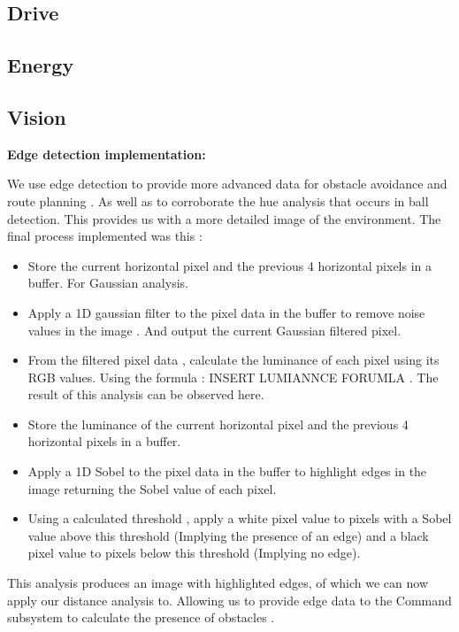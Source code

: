 \documentclass[10pt,twoside]{article}
\begin{document}
\subsection{Drive}

\subsection{Energy}

\subsection{Vision}

\textbf{Edge detection implementation:}

We use edge detection to provide more advanced data for obstacle avoidance and route planning . As well as to corroborate the hue analysis that occurs in ball detection. This provides us with a more detailed image of the environment. 
The final process implemented was this :

\begin{itemize}
    \itemsep-0.5em
    \item Store the current horizontal pixel and the previous 4 horizontal pixels in a buffer. For Gaussian analysis.
    \item Apply a 1D gaussian filter to the  pixel data in the buffer to remove noise values in the image . And output the current Gaussian filtered pixel.  
    \item From the filtered pixel data , calculate the luminance of each pixel using its RGB values. Using the formula : INSERT LUMIANNCE FORUMLA . The result of this analysis can be observed here. 
    \item Store the luminance of the current horizontal pixel and the previous 4 horizontal pixels in a buffer. 
    \item Apply a 1D Sobel to the  pixel data in the buffer to highlight edges in the image returning the Sobel value of each pixel.
    \item Using a calculated threshold , apply a white pixel value to pixels with a Sobel  value above this threshold (Implying the presence of an edge) and a black pixel value to pixels below this threshold (Implying no edge). 
\end{itemize}

This analysis produces an image with highlighted edges, of which we can now apply our distance analysis to. Allowing us to provide edge data to the Command subsystem to calculate the presence of obstacles .  
\end{document}
